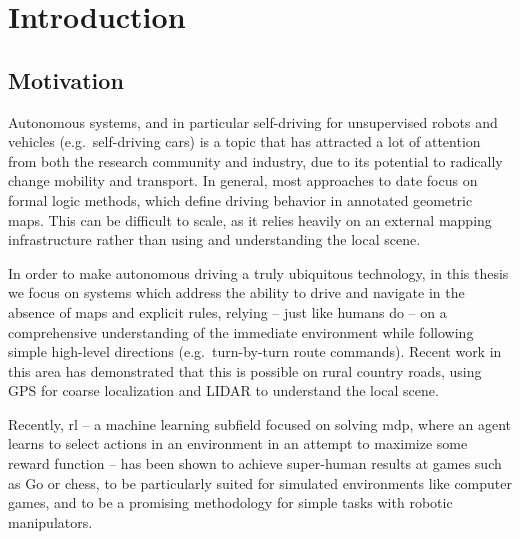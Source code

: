 \chapter{Introduction}

\section{Motivation}

Autonomous systems, and in particular self-driving for unsupervised robots and vehicles (e.g.\ self-driving cars) is a topic that has attracted a lot of attention from both the research community and industry, due to its potential to radically change mobility and transport. In general, most approaches to date focus on formal logic methods, which define driving behavior in annotated geometric maps. This can be difficult to scale, as it relies heavily on an external mapping infrastructure rather than using and understanding the local scene.

In order to make autonomous driving a truly ubiquitous technology, in this thesis we focus on systems which address the ability to drive and navigate in the absence of maps and explicit rules, relying – just like humans do – on a comprehensive understanding of the immediate environment while following simple high-level directions (e.g.\ turn-by-turn route commands). Recent work in this area has demonstrated that this is possible on rural country roads, using GPS for coarse localization and LIDAR to understand the local scene. 

Recently, \gls{rl} – a machine learning subfield focused on solving \gls{mdp}, where an agent learns to select actions in an environment in an attempt to maximize some reward function – has been shown to achieve super-human results at games such as Go or chess, to be particularly suited for simulated environments like computer games, and to be a promising methodology for simple tasks with robotic manipulators.

